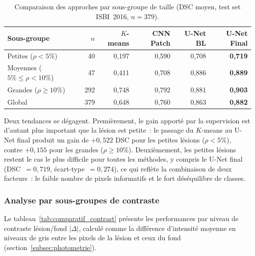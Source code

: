 \documentclass[12pt,a4paper]{article}
\begin{document}
\begin{table}[H]
\centering
\caption{Comparaison des approches par sous-groupe de taille (DSC moyen, test set ISBI~2016, $n = 379$).}
\label{tab:comparatif_subgroups}
\begin{tabular}{l r r r r r}
\toprule
\textbf{Sous-groupe} & \textbf{$n$} & \textbf{$K$-means} & \textbf{CNN Patch} & \textbf{U-Net BL} & \textbf{U-Net Final} \\
\midrule
Petites ($\rho < 5\%$)              & 40  & 0{,}197 & 0{,}590 & 0{,}708 & \textbf{0{,}719} \\
Moyennes ($5\% \leq \rho < 10\%$)   & 47  & 0{,}411 & 0{,}708 & 0{,}886 & \textbf{0{,}889} \\
Grandes ($\rho \geq 10\%$)          & 292 & 0{,}748 & 0{,}792 & 0{,}881 & \textbf{0{,}903} \\
\midrule
Global                               & 379 & 0{,}648 & 0{,}760 & 0{,}863 & \textbf{0{,}882} \\
\bottomrule
\end{tabular}
\end{table}

Deux tendances se dégagent. Premièrement, le gain apporté par la supervision est d'autant plus important que la lésion est petite~: le passage du $K$-means au U-Net final produit un gain de $+0{,}522$ DSC pour les petites lésions ($\rho < 5\%$), contre $+0{,}155$ pour les grandes ($\rho \geq 10\%$). Deuxièmement, les petites lésions restent le cas le plus difficile pour toutes les méthodes, y compris le U-Net final (DSC~$= 0{,}719$, écart-type~$= 0{,}274$), ce qui reflète la combinaison de deux facteurs~: le faible nombre de pixels informatifs et le fort déséquilibre de classes.

\subsubsection{Analyse par sous-groupes de contraste}

Le tableau~\ref{tab:comparatif_contrast} présente les performances par niveau de contraste lésion/fond $|\Delta|$, calculé comme la différence d'intensité moyenne en niveaux de gris entre les pixels de la lésion et ceux du fond (section~\ref{subsec:photometrie}).
\end{document}
